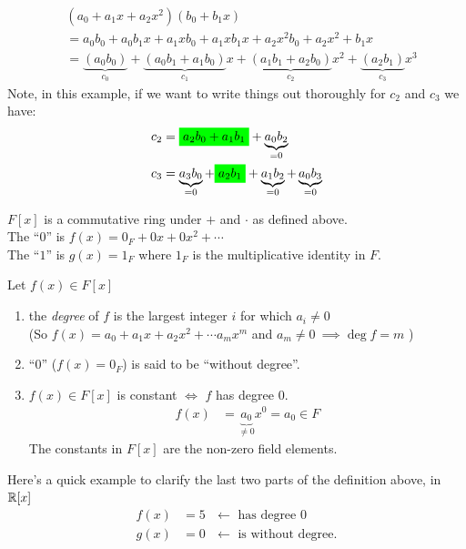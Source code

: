 \begin{example}
    \begin{align}
        &(a_0 + a_1x + a_2x^2)(b_0 + b_1x) \nonumber  \\
        &= a_0b_0 + a_0b_1x + a_1x b_0 + a_1xb_1x + a_2x^2b_0 + a_2x^2+b_1x \nonumber \\
        &= \underbrace{(a_0b_0)}_{c_0} + \underbrace{(a_0b_1+a_1b_0)}_{c_1}x + \underbrace{(a_1b_1+a_2b_0)}_{c_2}x^2+ \underbrace{(a_2b_1)}_{c_3}x^3 \nonumber
    \end{align}
    Note, in this example, if we want to write things out thoroughly for $c_2$ and $c_3$ we have:
    \begin{align}
        c_2 &= \colorbox{green}{$a_2b_0 + a_1b_1$}+\underbrace{a_0b_2}_{=0} \nonumber \\
        c_3 &= \underbrace{a_3b_0}_{=0}+ \colorbox{green}{$a_2b_1$}+ \underbrace{a_1b_2}_{=0} + \underbrace{a_0b_3}_{=0} \nonumber
    \end{align}
\end{example}
$F[x]$ is a commutative ring under $+$ and $\cdot$ as defined above. \\ 
\noindent The ``$0$'' is $f(x) = 0_F+ 0x + 0x^2 + \cdots  $ \\
\noindent The ``$1$'' is $g(x) = 1_F$ where $1_F$ is the multiplicative identity in $F$. \\
\begin{definition}
    Let $f(x) \in F[x]$ 
    \begin{enumerate}
        \item the \textit{degree} of $f$ is the largest integer $i$ for which $a_i \neq 0$ \\ \steezybreak 
        (So $f(x) = a_0 + a_1x + a_2x^2 + \cdots a_mx^m$ and $a_m \neq 0 \ \implies \deg f = m$ )
        \item ``$0$'' ($f(x)=0_F$) is said to be ``without degree''.
        \item $f(x)\in F[x]$ is constant $\iff$ $f$ has degree $0$.
        \begin{align}
            f(x) &= \underbrace{a_0}_{\neq 0} x^0 = a_0 \in F \nonumber
        \end{align}
        The constants in $F[x]$ are the non-zero field elements.
    \end{enumerate}
\end{definition}
Here's a quick example to clarify the last two parts of the definition above, in ${\mathbb{ R}}[x]$
\begin{align}
    f(x)&=5 \ \ \ \leftarrow \text{ has degree }0 \nonumber \\
    g(x)&=0 \ \ \ \leftarrow \text{ is without degree}. \nonumber
\end{align}


